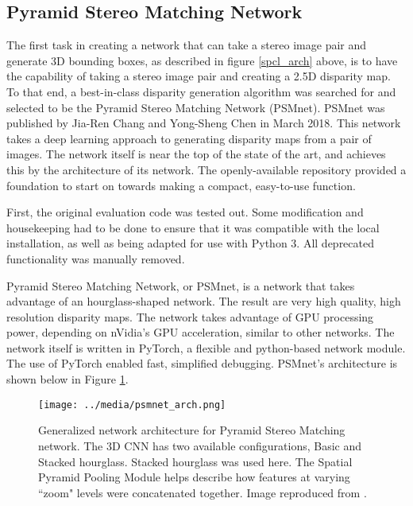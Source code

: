 \subsection{Pyramid Stereo Matching Network}
The first task in creating a network that can take a stereo image pair and generate 3D bounding boxes, as described in figure \ref{spcl_arch} above, is to have the capability of taking a stereo image pair and creating a 2.5D disparity map. To that end, a best-in-class disparity generation algorithm was searched for and selected to be the Pyramid Stereo Matching Network (PSMnet). PSMnet was published by Jia-Ren Chang and Yong-Sheng Chen in March 2018. This network takes a deep learning approach to generating disparity maps from a pair of images. The network itself is near the top of the state of the art, and achieves this by the architecture of its network. The openly-available repository provided a foundation to start on towards making a compact, easy-to-use function.

First, the original evaluation code was tested out. Some modification and housekeeping had to be done to ensure that it was compatible with the local installation, as well as being adapted for use with Python 3. All deprecated functionality was manually removed.

Pyramid Stereo Matching Network, or PSMnet, is a network that takes advantage of an hourglass-shaped network. The result are very high quality, high resolution disparity maps. The network takes advantage of GPU processing power, depending on nVidia's GPU acceleration, similar to other networks. The network itself is written in PyTorch, a flexible and python-based network module. The use of PyTorch enabled fast, simplified debugging. PSMnet's architecture is shown below in Figure \ref{psmnet_arch}.


\begin{figure}[ht]
	\texttt{[image: ../media/psmnet\_arch.png]}
	\caption{Generalized network architecture for Pyramid Stereo Matching network. The 3D CNN has two available configurations, Basic and Stacked hourglass. Stacked hourglass was used here. The Spatial Pyramid Pooling Module helps describe how features at varying ``zoom" levels were concatenated together. Image reproduced from \cite{chang_pyramid_2018}.}
	\label{psmnet_arch}
\end{figure}

